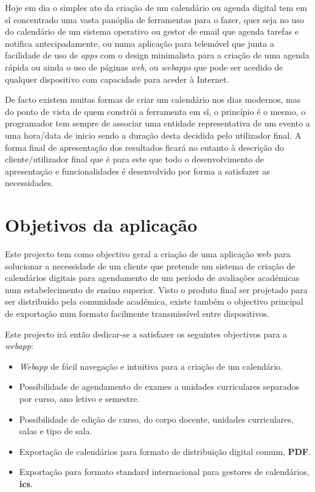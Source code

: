 \documentclass[11pt, twoside]{report}
\begin{document}
	Hoje em dia o simples ato da criação de um calendário ou agenda digital tem em sî concentrado uma vasta panóplia de ferramentas para o fazer, quer seja no uso do calendário de um sistema operativo ou gestor de email que agenda tarefas e notifica antecipadamente, ou numa aplicação para telemóvel que junta a facilidade de uso de \textit{apps} com o design minimalista para a criação de uma agenda rápida ou ainda o uso de páginas \textit{web}, ou \textit{webapps} que pode ser acedido de qualquer dispositivo com capacidade para aceder à Internet.
	
	De facto existem muitas formas de criar um calendário nos dias modernos, mas do ponto de vista de quem constrói a ferramenta em sî, o princípio é o mesmo, o programador tem sempre de associar uma entidade representativa de um evento a uma hora/data de inicio sendo a duração desta decidida pelo utilizador final.
	A forma final de apresentação dos resultados ficará no entanto à descrição do cliente/utilizador final que é para este que todo o desenvolvimento de apresentação e funcionalidades é desenvolvido por forma a satisfazer as necessidades.
	
	
	\section{Objetivos da aplicação}
	
	Este projecto tem como objectivo geral a criação de uma aplicação web para solucionar a necessidade de um cliente que pretende um sistema de criação de calendários digitais para agendamento de um período de avaliações académicas num estabelecimento de ensino superior.
	Visto o produto final ser projetado para ser distribuído pela comunidade académica, existe também o objectivo principal de exportação num formato facilmente transmissível entre dispositivos. 
	
	Este projecto irá então dedicar-se a satisfazer os seguintes objectivos para a \textit{webapp}:
	\begin{itemize}
		\item \textit{Webapp} de fácil navegação e intuitiva para a criação de um calendário.
		\item Possibilidade de agendamento de exames a unidades curriculares separados por curso, ano letivo e semestre.  
		\item Possibilidade de edição de curso, do corpo docente, unidades curriculares, salas e tipo de sala.
		\item Exportação de calendários para formato de distribuição digital comum, \textbf{PDF}.
		\item Exportação para formato standard internacional para gestores de calendários, \textbf{ics}. 
	\end{itemize}
	
\end{document}
